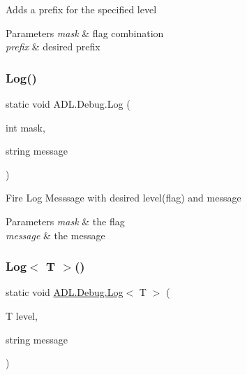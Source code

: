 Adds a prefix for the specified level 


\begin{DoxyParams}{Parameters}
{\em mask} & flag combination\\
\hline
{\em prefix} & desired prefix\\
\hline
\end{DoxyParams}
\mbox{\label{class_a_d_l_1_1_debug_a169452dbed965a360a23e112ed9956c3}} 
\subsubsection{\texorpdfstring{Log()}{Log()}}
{\footnotesize\ttfamily static void A\+D\+L.\+Debug.\+Log (\begin{DoxyParamCaption}\item[{int}]{mask,  }\item[{string}]{message }\end{DoxyParamCaption})\hspace{0.3cm}{\ttfamily [static]}}



Fire Log Messsage with desired level(flag) and message 


\begin{DoxyParams}{Parameters}
{\em mask} & the flag\\
\hline
{\em message} & the message\\
\hline
\end{DoxyParams}
\mbox{\label{class_a_d_l_1_1_debug_a4162ccb62b2facbc5ab9f981abe6fa3e}} 
\subsubsection{\texorpdfstring{Log$<$ T $>$()}{Log< T >()}}
{\footnotesize\ttfamily static void \mbox{\hyperlink{class_a_d_l_1_1_debug_a169452dbed965a360a23e112ed9956c3}{A\+D\+L.\+Debug.\+Log}}$<$ T $>$ (\begin{DoxyParamCaption}\item[{T}]{level,  }\item[{string}]{message }\end{DoxyParamCaption})\hspace{0.3cm}{\ttfamily [static]}}



